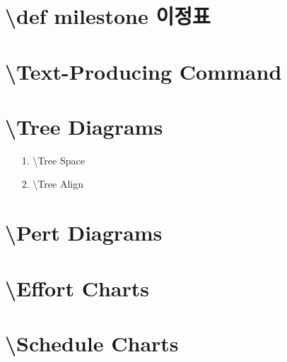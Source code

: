 	\clearpage
	\section{\textbackslash def milestone 이정표}
	
	
	\clearpage
	\section{\textbackslash Text-Producing Command}


	\clearpage
	\section{\textbackslash Tree Diagrams}
	
	
			\begin{itemize}[topsep=0.0em, parsep=0.0em, itemsep=0em, leftmargin=4.0em, labelwidth=3em, labelsep=3em] 
			\item 	[1.] 	\textbackslash Tree Space
			\item 	[2.] 	\textbackslash Tree Align
			\end{itemize}



	\clearpage
	\section{\textbackslash Pert Diagrams}
	
	
	\clearpage
	\section{\textbackslash Effort Charts}
	
	
	\clearpage
	\section{\textbackslash Schedule Charts}
	
	
	
	
	
	
